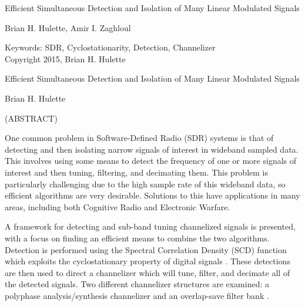 \documentclass[12pt]{article}
\begin{document}
\newcommand{\fourier}{\mathcal{F}}

\thispagestyle{empty}
\begin{center}

{\large Efficient Simultaneous Detection and Isolation of
Many Linear Modulated Signals}

\vfill

Brian H. Hulette, Amir I. Zaghloul

\vfill

Keywords: SDR, Cyclostationarity, Detection, Channelizer
\\
Copyright 2015, Brian H. Hulette

\end{center}

\pagebreak

\thispagestyle{empty}
\begin{center}

{\large Efficient Simultaneous Detection and Isolation of
Many Linear Modulated Signals}

\vfill

Brian H. Hulette

\vfill

(ABSTRACT)

\vfill

\end{center}

One common problem in Software-Defined Radio (SDR) systems is that of
detecting and then isolating narrow signals of interest in wideband sampled
data. This involves using some means to detect the frequency of one or more
signals of interest and then tuning, filtering, and decimating them. This
problem is particularly challenging due to the high sample rate of this
wideband data, so efficient algorithms are very desirable. Solutions to this
have applications in many areas, including both Cognitive Radio and
Electronic Warfare.

A framework for detecting and sub-band tuning channelized signals is presented,
with a focus on finding an efficient means to combine the two algorithms.
Detection is performed using the Spectral Correlation Density (SCD) function
which exploits the cyclostationary property of digital signals \cite{Gardner1}.
These detections are then used to direct a channelizer which will tune, filter,
and decimate all of the detected signals. Two different channelizer structures
are examined: a polyphase analysis/synthesis channelizer \cite{Harris1} and an
overlap-save filter bank \cite{Borgerding1}.
\end{document}
